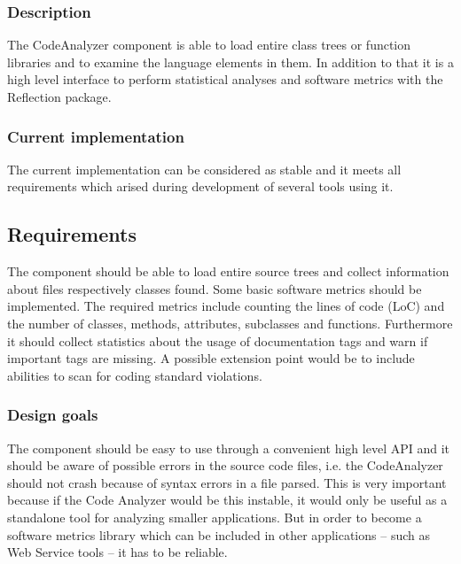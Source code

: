 \documentclass[10pt,final,a4paper,oneside]{article}
\begin{document}
\subsubsection{Description}
The CodeAnalyzer component is able to load entire class trees
or function libraries
and to examine the language elements in them.
In addition to that it is a high level interface to
perform statistical analyses and software metrics with
the Reflection package.

\subsubsection{Current implementation}
The current implementation can be considered as stable
and it meets all requirements which arised during
development of several tools using it.

\subsection{Requirements}\label{subsec:CodeAnalyzerRequirements}
The component should be able to load entire source trees
and collect information about files respectively classes found.
Some basic software metrics should be implemented.
The required metrics include
counting the lines of code (LoC) and the number of
classes, methods, attributes, subclasses and functions.
Furthermore it should collect statistics
about the usage of documentation tags
and warn if important tags are missing.
A possible extension point would be to include abilities
to scan for coding standard violations.

\subsubsection{Design goals}
The component should be easy to use through a convenient high level API
and it should be aware of possible errors in the source code files, i.e.
the CodeAnalyzer should not crash because of syntax errors in a file parsed.
This is very important because if the Code Analyzer would be this instable,
it would only be useful as a standalone tool for analyzing
smaller applications. But in order to become a software metrics library
which can be included in other applications -- such as Web Service tools --
it has to be reliable.


\end{document}
